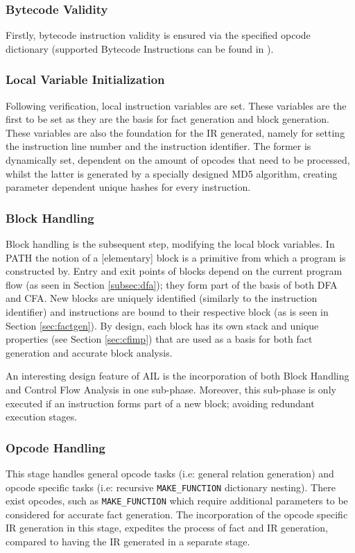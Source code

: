             \subsubsection*{Bytecode Validity}
            Firstly, bytecode instruction validity is ensured via the specified opcode dictionary (supported Bytecode Instructions can be found in ).
            \subsubsection*{Local Variable Initialization}
            \par Following verification, local instruction variables are set. These variables are the first to be set as they are the basis for fact generation and block generation. These variables are also the foundation for the \acs{IR} generated, namely for setting the instruction line number 
            and the instruction identifier. The former is dynamically set, dependent on the amount of opcodes that need to be processed, whilst the latter is generated by a specially designed \acs{MD5} algorithm, creating parameter dependent unique hashes for every instruction.
            \subsubsection*{Block Handling}
            \par Block handling is the subsequent step, modifying the local block variables. In \acs{PATH} the notion of a [elementary] block is a primitive from which a program is constructed by. Entry and exit points of blocks depend on the current program flow (as seen in Section \ref{subsec:dfa}); they form part of the 
            basis of both \acs{DFA} and \acs{CFA}. New blocks are uniquely identified (similarly to the instruction identifier) and instructions are bound to their respective block (as is seen in Section \ref{sec:factgen}). By design, each block
            has its own stack and unique properties (see Section \ref{sec:cfimp}) that are used as a basis for both fact generation and accurate block analysis.
            \par An interesting design feature of \acs{AIL} is the incorporation of both Block Handling and Control Flow Analysis in one sub-phase. Moreover, this sub-phase is only executed if an instruction forms part of a new block; avoiding redundant execution stages.  
            \subsubsection*{Opcode Handling}
            \par This stage handles general opcode tasks (i.e: general relation generation) and opcode specific tasks (i.e: recursive \lstinline|MAKE_FUNCTION| dictionary nesting). There exist opcodes, such as \lstinline|MAKE_FUNCTION| which require additional parameters to be considered for accurate fact generation. The incorporation of the opcode specific \acs{IR} generation in this stage, expedites the process of fact and IR generation, compared to 
            having the \acs{IR} generated in a separate stage.
